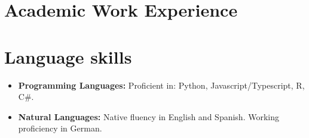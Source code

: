 \documentclass[11pt,a4paper,sans]{moderncv}
\begin{document}



\section{Academic Work Experience}
\vspace{5pt}


\section{Language skills}

\vspace{6pt}

\begin{itemize}

\item \textbf{Programming Languages:} Proficient in: Python, Javascript/Typescript, R, C\#.

\vspace{6pt}

\item \textbf{Natural Languages:} Native fluency in English and Spanish. Working proficiency in German.
\vspace{6pt}

\end{itemize}
\end{document}
